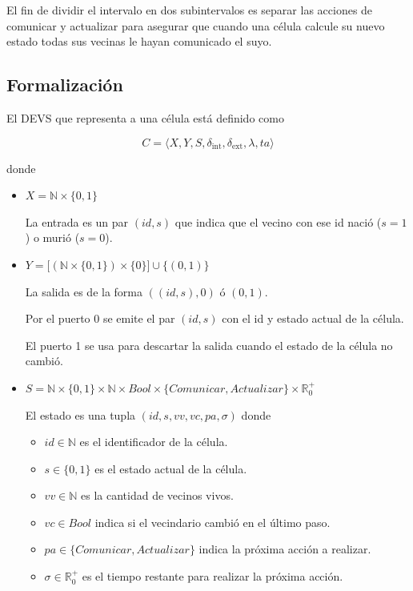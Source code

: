 \documentclass[12pt]{article}
\newcommand{\dint}{\delta_{\text{int}}}
\newcommand{\dext}{\delta_{\text{ext}}}
\newcommand{\R}{\mathbb{R}}
\newcommand{\N}{\mathbb{N}}
\begin{document}
El fin de dividir el intervalo en dos subintervalos es separar las acciones de comunicar y actualizar para asegurar que cuando una célula calcule su nuevo estado todas sus vecinas le hayan comunicado el suyo.


\subsection{Formalización}


El DEVS que representa a una célula está definido como

\[ C = \langle X, Y, S, \dint, \dext, \lambda, ta \rangle \]

donde

\begin{itemize}
  \item $X = \N \times \{0,1\}$

    La entrada es un par $(id, s)$ que indica que el vecino con ese id nació ($s=1$) o murió ($s=0$).

  \item $Y = \big[ (\N \times \{0,1\}) \times \{0\} \big] \cup \{(0, 1)\}$

    La salida es de la forma $((id, s), 0)$ ó $(0, 1)$.

    Por el puerto 0 se emite el par $(id, s)$ con el id y estado actual de la célula.

    El puerto 1 se usa para descartar la salida cuando el estado de la célula no cambió.

  \item $S = \N \times \{0, 1\} \times \N \times Bool \times \{Comunicar, Actualizar\} \times \R_0^+$

    El estado es una tupla $(id, s, vv, vc, pa, \sigma)$ donde

    \begin{itemize}
      \item $id \in \N$ es el identificador de la célula.
      \item $s \in \{0, 1\}$ es el estado actual de la célula.
      \item $vv \in \N$ es la cantidad de vecinos vivos.
      \item $vc \in Bool$ indica si el vecindario cambió en el último paso.
      \item $pa \in \{Comunicar, Actualizar\}$ indica la próxima acción a realizar.
      \item $\sigma \in \R_0^+$ es el tiempo restante para realizar la próxima acción.
    \end{itemize}


\end{itemize}
\end{document}
